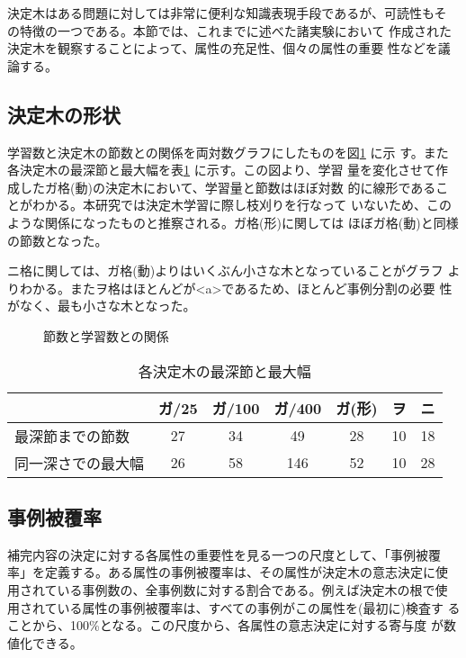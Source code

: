決定木はある問題に対しては非常に便利な知識表現手段であるが、可読性もそ
の特徴の一つである\cite{田中}。本節では、これまでに述べた諸実験において
作成された決定木を観察することによって、属性の充足性、個々の属性の重要
性などを議論する。

\subsection{決定木の形状}

学習数と決定木の節数との関係を両対数グラフにしたものを図\ref{節数} に示
す。また各決定木の最深節と最大幅を表\ref{深さ} に示す。この図より、学習
量を変化させて作成したガ格(動)の決定木において、学習量と節数はほぼ対数
的に線形であることがわかる。本研究では決定木学習に際し枝刈りを行なって
いないため、このような関係になったものと推察される。ガ格(形)に関しては
ほぼガ格(動)と同様の節数となった。

ニ格に関しては、ガ格(動)よりはいくぶん小さな木となっていることがグラフ
よりわかる。またヲ格はほとんどが<a>であるため、ほとんど事例分割の必要
性がなく、最も小さな木となった。


\begin{figure}
\begin{center}
\caption{節数と学習数との関係}
\label{節数}
\end{center}
\end{figure}

\begin{table}
\begin{center}
\caption{各決定木の最深節と最大幅}
\label{深さ}
\begin{tabular}{l|*{6}{c}}
\hline\hline
  & ガ/25&ガ/100&ガ/400&ガ(形)&ヲ&ニ\\
\hline
  最深節までの節数 &  27 &   34 &   49 & 28 & 10 & 18\\
同一深さでの最大幅 &  26 &   58 &  146 & 52 & 10 & 28\\
\hline
\end{tabular}
\end{center}
\end{table}


\subsection{事例被覆率}

補完内容の決定に対する各属性の重要性を見る一つの尺度として、「事例被覆
率」を定義する。ある属性の事例被覆率は、その属性が決定木の意志決定に使
用されている事例数の、全事例数に対する割合である。例えば決定木の根で使
用されている属性の事例被覆率は、すべての事例がこの属性を(最初に)検査す
ることから、100\%となる。この尺度から、各属性の意志決定に対する寄与度
が数値化できる。

